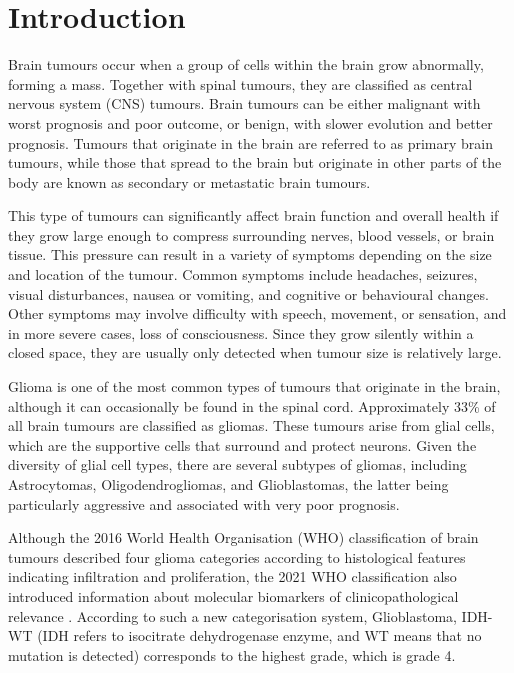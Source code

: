 \documentclass[12pt, a4paper]{report}
\begin{document}
\newpage  %

\tableofcontents %
\newpage  %
\setcounter{page}{1} %

\chapter{Introduction}

Brain tumours occur when a group of cells within the brain grow abnormally, forming a mass. Together with spinal tumours, they are classified as central nervous system (CNS) tumours. Brain tumours can be either malignant with worst prognosis and poor outcome, or benign, with slower evolution and better prognosis. Tumours that originate in the brain are referred to as primary brain tumours, while those that spread to the brain but originate in other parts of the body are known as secondary or metastatic brain tumours.

This type of tumours can significantly affect brain function and overall health if they grow large enough to compress surrounding nerves, blood vessels, or brain tissue. This pressure can result in a variety of symptoms depending on the size and location of the tumour. Common symptoms include headaches, seizures, visual disturbances, nausea or vomiting, and cognitive or behavioural changes. Other symptoms may involve difficulty with speech, movement, or sensation, and in more severe cases, loss of consciousness. Since they grow silently within a closed space, they are usually only detected when tumour size is relatively large. 

Glioma is one of the most common types of tumours that originate in the brain, although it can occasionally be found in the spinal cord. Approximately 33\% of all brain tumours are classified as gliomas. These tumours arise from glial cells, which are the supportive cells that surround and protect neurons. Given the diversity of glial cell types, there are several subtypes of gliomas, including Astrocytomas, Oligodendrogliomas, and Glioblastomas, the latter being particularly aggressive and associated with very poor prognosis.

Although the 2016 World Health Organisation (WHO) classification of brain tumours described four glioma categories according to histological features indicating infiltration and proliferation, the 2021 WHO classification also introduced information about molecular biomarkers of clinicopathological relevance \cite{Louis2021}. According to such a new categorisation system, Glioblastoma, IDH-WT (IDH refers to isocitrate dehydrogenase enzyme, and WT means that no mutation is detected) corresponds to the highest grade, which is grade 4. 
\end{document}
